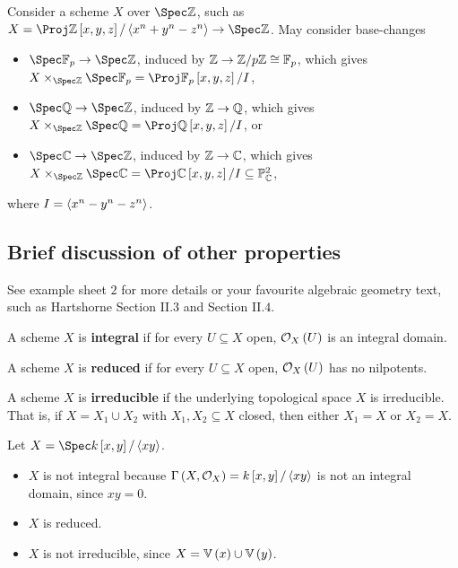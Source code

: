 \begin{example*}
Consider a scheme $ X $ over $ \Spec \ZZ $, such as $ X = \Proj \ZZ\sbr{x, y, z} / \abr{x^n + y^n - z^n} \to \Spec \ZZ $. May consider base-changes
\begin{itemize}
\item $ \Spec \FF_p \to \Spec \ZZ $, induced by $ \mathbb{Z} \to \mathbb{Z} / p\mathbb{Z} \cong \mathbb{F}_p $, which gives $ X \times_{\Spec \ZZ} \Spec \FF_p = \Proj \FF_p\sbr{x, y, z} / I $,
\item $ \Spec \QQ \to \Spec \ZZ $, induced by $ \mathbb{Z} \to \mathbb{Q} $, which gives $ X \times_{\Spec \ZZ} \Spec \QQ = \Proj \QQ\sbr{x, y, z} / I $, or
\item $ \Spec \CC \to \Spec \ZZ $, induced by $ \mathbb{Z} \to \mathbb{C} $, which gives $ X \times_{\Spec \ZZ} \Spec \CC = \Proj \CC\sbr{x, y, z} / I \subseteq \PP_\CC^2 $,
\end{itemize}
where $ I = \left\langle x^n - y^n - z^n \right\rangle $.
\end{example*}

\subsection{Brief discussion of other properties}

See example sheet $ 2 $ for more details or your favourite algebraic geometry text, such as Hartshorne Section II.$ 3 $ and Section II.$ 4 $.

\begin{definition*}
A scheme $ X $ is \textbf{integral} if for every $ U \subseteq X $ open, $ \OOO_X\br{U} $ is an integral domain.
\end{definition*}

\begin{definition*}
A scheme $ X $ is \textbf{reduced} if for every $ U \subseteq X $ open, $ \OOO_X\br{U} $ has no nilpotents.
\end{definition*}

\begin{definition*}
A scheme $ X $ is \textbf{irreducible} if the underlying topological space $ X $ is irreducible. That is, if $ X = X_1 \cup X_2 $ with $ X_1, X_2 \subseteq X $ closed, then either $ X_1 = X $ or $ X_2 = X $.
\end{definition*}

\begin{example*}
Let $ X = \Spec k\sbr{x, y} / \abr{xy} $.
\begin{itemize}
\item $ X $ is not integral because $ \Gamma\br{X, \OOO_X} = k\sbr{x, y} / \abr{xy} $ is not an integral domain, since $ xy = 0 $.
\item $ X $ is reduced.
\item $ X $ is not irreducible, since $ X = \VV\br{x} \cup \VV\br{y} $.
\end{itemize}
\end{example*}

